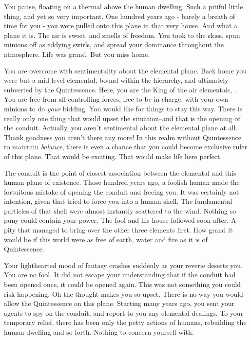 \documentclass[char]{elementals}
\begin{document}
\name{\cKing{}}


You pause, floating on a thermal above the human dwelling. Such a pitiful little thing, and yet so very important. One hundred years ago - barely a breath of time for you - you were pulled onto this plane in that very house. And what a plane it is. The air is sweet, and smells of freedom. You took to the skies, spun minions off as eddying swirls, and spread your dominance throughout the atmosphere.  Life was grand. But you miss home.

You are overcome with sentimentality about the elemental plane. Back home you were but a mid-level elemental, bound within the hierarchy, and ultimately subverted by the Quintessence. Here, you are the King of the air elementals, \cKing{\intro}. You are free from all controlling forces, free to be in charge, with your own minions to do \emph{your} bidding. You would like for things to stay this way. There is really only one thing that would upset the situation--and that is the opening of the conduit. Actually, you aren't sentimental about the elemental plane at all. Thank goodness you aren't there any more! In this realm without Quintessence to maintain \emph{balance}, there is even a chance that you could become exclusive ruler of this plane. That would be exciting. That would make life here perfect.

The conduit is the point of closest association between the elemental and this human plane of existence. Those hundred years ago, a foolish human made the fortuitous mistake of opening the conduit and freeing you. It was certainly not \cGrandfather{\their} intention, given that \cGrandfather{\they} tried to force you into a human shell. The fundamental particles of that shell were almost instantly scattered to the wind. Nothing so puny could contain your power. The fool and his house followed soon after. A pity that \cGrandfather{} managed to bring over the other three elements first. How grand it would be if this world were as free of earth, water and fire as it is of Quintessence.

Your lighthearted mood of fantasy crashes suddenly as your reverie deserts you. You are no fool. It did not escape your understanding that if the conduit had been opened once, it could be opened again. This was not something you could risk happening. Oh the thought makes you so upset. There is no way you would allow the Quintessence on this plane. Starting many years ago, you sent your agents to spy on the conduit, and report to you any elemental dealings. To your temporary relief, there has been only the petty actions of humans, rebuilding the human dwelling and so forth. Nothing to concern yourself with.
\end{document}
